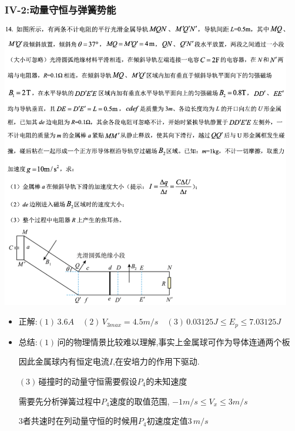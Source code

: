 \documentclass{article}
\begin{document}
\subsubsection{IV-2:动量守恒与弹簧势能}
\includegraphics[width=0.95\textwidth,keepaspectratio]{./pictures/3.10-2.png}

\begin{itemize}
    \item 正解:\quad $(1) \, 3.6A \quad (2) \, V_{3max} = 4.5 m/s \quad (3) \, 0.03125 J \leq E_{p} \leq 7.03125 J $
    \item 总结:\quad $(1) \,$问的物理情景比较难以理解,事实上金属球可作为导体连通两个板

          \hspace{3.2em}因此金属球内有恒定电流$I$,在安培力的作用下驱动.

          \hspace{3.2em}$(3) \,$碰撞时的动量守恒需要假设$P_{4}$的未知速度

          \hspace{3.2em}需要先分析弹簧过程中$P_{4}$速度的取值范围, $-1m/s \leq V_{x} \leq 3 m/s$

          \hspace{3.2em}$3$者共速时在列动量守恒的时候用$P_{4}$初速度定值$3 \, m/s$
\end{itemize}

\vspace{2em}
\end{document}
